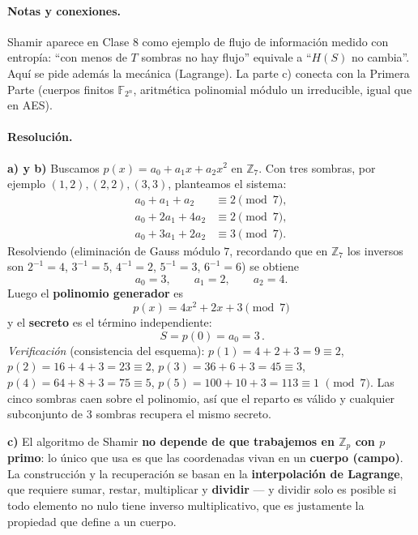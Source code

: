 \paragraph{Notas y conexiones.}
Shamir aparece en Clase 8 como ejemplo de flujo de información medido con entropía: ``con
menos de $T$ sombras no hay flujo'' equivale a ``$H(S)$ no cambia''. Aquí se pide además la
mecánica (Lagrange). La parte c) conecta con la Primera Parte (cuerpos finitos
$\mathbb{F}_{2^n}$, aritmética polinomial módulo un irreducible, igual que en AES).

\paragraph{Resolución.}

\textbf{a) y b)} Buscamos $p(x)=a_0+a_1x+a_2x^2$ en $\mathbb{Z}_7$. Con tres sombras, por
ejemplo $(1,2),(2,2),(3,3)$, planteamos el sistema:
\begin{align*}
a_0 + a_1 + a_2 &\equiv 2 \pmod 7,\\
a_0 + 2a_1 + 4a_2 &\equiv 2 \pmod 7,\\
a_0 + 3a_1 + 2a_2 &\equiv 3 \pmod 7.
\end{align*}
Resolviendo (eliminación de Gauss módulo $7$, recordando que en $\mathbb{Z}_7$ los inversos
son $2^{-1}=4$, $3^{-1}=5$, $4^{-1}=2$, $5^{-1}=3$, $6^{-1}=6$) se obtiene
\begin{equation*}
a_0 = 3,\qquad a_1 = 2,\qquad a_2 = 4.
\end{equation*}
Luego el \textbf{polinomio generador} es
\begin{equation*}
\boxed{\,p(x) = 4x^2 + 2x + 3 \pmod 7\,}
\end{equation*}
y el \textbf{secreto} es el término independiente:
\begin{equation*}
\boxed{\,S = p(0) = a_0 = 3\,.}
\end{equation*}
\emph{Verificación} (consistencia del esquema): $p(1)=4+2+3=9\equiv 2$, $p(2)=16+4+3=23\equiv
2$, $p(3)=36+6+3=45\equiv 3$, $p(4)=64+8+3=75\equiv 5$, $p(5)=100+10+3=113\equiv 1$
$\pmod 7$. Las cinco sombras caen sobre el polinomio, así que el reparto es válido y
cualquier subconjunto de $3$ sombras recupera el mismo secreto.

\textbf{c)} El algoritmo de Shamir \textbf{no depende de que trabajemos en $\mathbb{Z}_p$
con $p$ primo}: lo único que usa es que las coordenadas vivan en un \textbf{cuerpo (campo)}.
La construcción y la recuperación se basan en la \textbf{interpolación de Lagrange}, que
requiere sumar, restar, multiplicar y \textbf{dividir} --- y dividir solo es posible si todo
elemento no nulo tiene inverso multiplicativo, que es justamente la propiedad que define a un
cuerpo.

